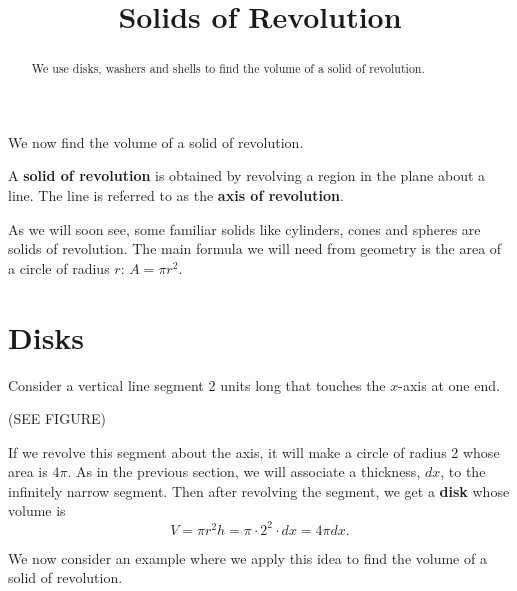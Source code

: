 \documentclass{ximera}
\title{Solids of Revolution}
\begin{document}
\begin{abstract}
We use disks, washers and shells to find the volume of a solid of revolution.
\end{abstract}

\maketitle

We now find the volume of a solid of revolution.  

\begin{definition} A \textbf{solid of revolution} is obtained by revolving a region in the plane about 
a line.  The line is referred to as the \textbf{axis of revolution}.

\end{definition}

As we will soon see, some familiar solids like cylinders, cones and spheres are solids of revolution.
The main formula we will need from geometry is the area of a circle of radius $r$: $A = \pi r^2$. 

\section{Disks}

Consider a vertical line segment 2 units long that touches the $x$-axis at one end.  

(SEE FIGURE)


If we revolve this segment about the axis, it will make a circle of radius 2 whose area is $4\pi$.
As in the previous section, we will associate a thickness, $dx$, to the infinitely narrow segment.
Then after revolving the segment, we get a \textbf{disk} whose volume is 
\[
V = \pi r^2 h = \pi \cdot 2^2 \cdot dx = 4\pi dx.
\]

We now consider an example where we apply this idea to find the volume of a solid of revolution.
\end{document}
